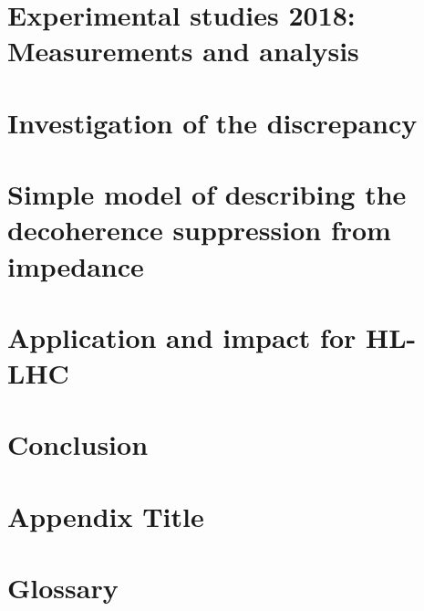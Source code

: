 \documentclass[12pt,twoside]{report} %
\begin{document}
\chapter{Experimental studies 2018: Measurements and analysis}\label{Ch:2018_analyisis}


\chapter{Investigation of the discrepancy}


\chapter{Simple model of describing the decoherence suppression from impedance}


\chapter{Application and impact for HL-LHC}


\chapter{Conclusion}


\printglossaries
\appendix
\chapter{Appendix Title}

\chapter{Glossary}


\backmatter
\printbibliography
{}
\end{document}
